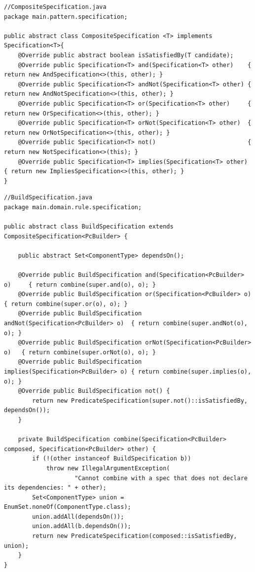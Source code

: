 \documentclass[12pt,a4paper]{article}
\begin{document}
\begin{lstlisting}[style=intellijlight, caption={A simple Java class}, label={lst:hello}]
//CompositeSpecification.java
package main.pattern.specification;

public abstract class CompositeSpecification <T> implements Specification<T>{
    @Override public abstract boolean isSatisfiedBy(T candidate);
    @Override public Specification<T> and(Specification<T> other)    { return new AndSpecification<>(this, other); }
    @Override public Specification<T> andNot(Specification<T> other) { return new AndNotSpecification<>(this, other); }
    @Override public Specification<T> or(Specification<T> other)     { return new OrSpecification<>(this, other); }
    @Override public Specification<T> orNot(Specification<T> other)  { return new OrNotSpecification<>(this, other); }
    @Override public Specification<T> not()                          { return new NotSpecification<>(this); }
    @Override public Specification<T> implies(Specification<T> other) { return new ImpliesSpecification<>(this, other); }
}

\end{lstlisting}

\begin{lstlisting}[style=intellijlight, caption={A simple Java class}, label={lst:hello}]
//BuildSpecification.java
package main.domain.rule.specification;

public abstract class BuildSpecification extends CompositeSpecification<PcBuilder> {

    public abstract Set<ComponentType> dependsOn();

    @Override public BuildSpecification and(Specification<PcBuilder> o)     { return combine(super.and(o), o); }
    @Override public BuildSpecification or(Specification<PcBuilder> o)      { return combine(super.or(o), o); }
    @Override public BuildSpecification andNot(Specification<PcBuilder> o)  { return combine(super.andNot(o), o); }
    @Override public BuildSpecification orNot(Specification<PcBuilder> o)   { return combine(super.orNot(o), o); }
    @Override public BuildSpecification implies(Specification<PcBuilder> o) { return combine(super.implies(o), o); }
    @Override public BuildSpecification not() {
        return new PredicateSpecification(super.not()::isSatisfiedBy, dependsOn());
    }

    private BuildSpecification combine(Specification<PcBuilder> composed, Specification<PcBuilder> other) {
        if (!(other instanceof BuildSpecification b))
            throw new IllegalArgumentException(
                    "Cannot combine with a spec that does not declare its dependencies: " + other);
        Set<ComponentType> union = EnumSet.noneOf(ComponentType.class);
        union.addAll(dependsOn());
        union.addAll(b.dependsOn());
        return new PredicateSpecification(composed::isSatisfiedBy, union);
    }
}

\end{lstlisting}
\end{document}
